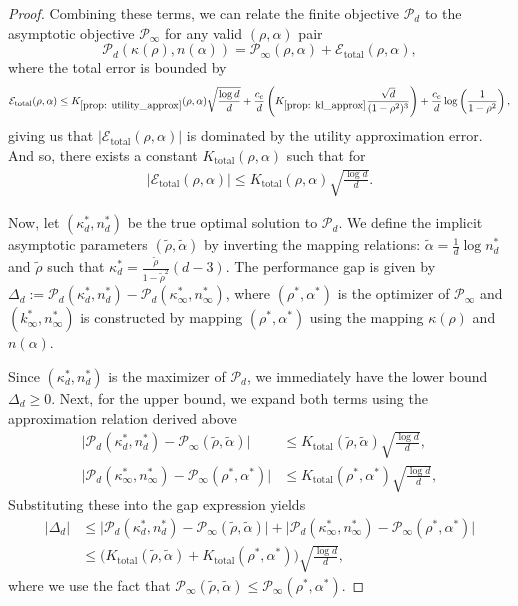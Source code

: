 \documentclass[12pt]{article}
\theoremstyle{definition}
\theoremstyle{remark}
\begin{document}
\begin{proof}
Combining these terms, we can relate the finite objective $\mathcal{P}_d$ to the asymptotic objective $\mathcal{P}_\infty$ for any valid $(\rho, \alpha)$ pair
\begin{equation*}
    \mathcal{P}_d(\kappa(\rho), n(\alpha)) = \mathcal{P}_\infty(\rho, \alpha) + \mathcal{E}_{\text{total}}(\rho, \alpha),
\end{equation*}
where the total error is bounded by
\begin{align*}
\mathcal{E}_{\text{total}}(\rho, \alpha) \leq K_{\ref{prop: utility_approx}}(\rho,\alpha) \sqrt{\frac{\log d}{d}} + \frac{c_c}{d} \left(K_{\ref{prop: kl_approx}} \frac{\sqrt{d}}{(1-\rho^2)^3}\right) + \frac{c_c}{d} \log \left(\frac{1}{1-\rho^2}\right),
\end{align*}
giving us that $|\mathcal{E}_{\text{total}}(\rho, \alpha)| $ is dominated by the utility approximation error. And so, there exists a constant $K_{\text{total}}(\rho,\alpha)$ such that for
\begin{align*}
    |\mathcal{E}_{\text{total}}(\rho,\alpha)| \leq K_{\text{total}}(\rho,\alpha)\sqrt{\frac{\log d}{d}}.
\end{align*}

Now, let $(\kappa^*_d, n^*_d)$ be the true optimal solution to $\mathcal{P}_d$. We define the implicit asymptotic parameters $(\tilde{\rho}, \tilde{\alpha})$ by inverting the mapping relations: $\tilde{\alpha} = \frac{1}{d} \log n^*_d$ and $\tilde{\rho}$ such that $\kappa^*_d = \frac{\tilde{\rho}}{1-\tilde{\rho}^2}(d-3)$. The performance gap is given by $\Delta_d := \mathcal{P}_d(\kappa^*_d, n^*_d) - \mathcal{P}_d(\kappa^*_\infty, n^*_\infty)$, where $(\rho^*,\alpha^*)$ is the optimizer of $\mathcal{P}_{\infty}$ and $(k^*_\infty,n^*_\infty)$ is constructed by mapping $(\rho^*,\alpha^*)$ using the mapping $\kappa(\rho)$ and $n(\alpha)$.

Since $(\kappa^*_d, n^*_d)$ is the maximizer of $\mathcal{P}_d$, we immediately have the lower bound $\Delta_d \ge 0$. Next, for the upper bound, we expand both terms using the approximation relation derived above
\begin{align*}
    \big|\mathcal{P}_d(\kappa^*_d, n^*_d) - \mathcal{P}_\infty(\tilde{\rho}, \tilde{\alpha})\big| & \leq K_{\text{total}}(\tilde \rho,\tilde \alpha)\sqrt{\frac{\log d}{d}},\\
    \big|\mathcal{P}_d(\kappa^*_\infty, n^*_\infty) - \mathcal{P}_\infty(\rho^*, \alpha^*)\big|& \leq  K_{\text{total}}(\rho^*,\alpha^*)\sqrt{\frac{\log d}{d}},
\end{align*}
Substituting these into the gap expression yields
\begin{align*}
    \big|\Delta_d \big| & \leq  \big|\mathcal{P}_d(\kappa^*_d, n^*_d) - \mathcal{P}_\infty(\tilde{\rho}, \tilde{\alpha})\big|+ \big|\mathcal{P}_d(\kappa^*_\infty, n^*_\infty) - \mathcal{P}_\infty(\rho^*, \alpha^*)\big|\\
    & \leq \big( K_{\text{total}}(\tilde \rho,\tilde \alpha) + K_{\text{total}}(\rho^*,\alpha^*)\big) \sqrt{\frac{\log d}{d}},
\end{align*}
where we use the fact that $\mathcal{P}_\infty(\tilde{\rho}, \tilde{\alpha}) \le \mathcal{P}_\infty(\rho^*, \alpha^*)$.


\end{proof}
\end{document}
